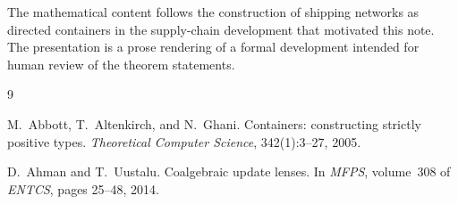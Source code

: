 \documentclass[11pt,a4paper]{article}
\theoremstyle{plain}
\theoremstyle{definition}
\begin{document}
The mathematical content follows the construction of shipping networks as
directed containers in the supply-chain development that motivated this note.
The presentation is a prose rendering of a formal development intended for
human review of the theorem statements.

\begin{thebibliography}{9}

M.~Abbott, T.~Altenkirch, and N.~Ghani.
\newblock Containers: constructing strictly positive types.
\newblock \emph{Theoretical Computer Science}, 342(1):3--27, 2005.

D.~Ahman and T.~Uustalu.
\newblock Coalgebraic update lenses.
\newblock In \emph{MFPS}, volume~308 of \emph{ENTCS}, pages 25--48, 2014.

\end{thebibliography}
\end{document}
